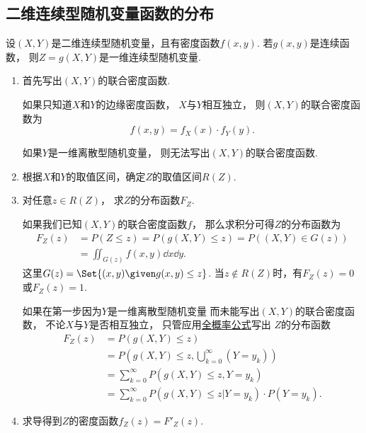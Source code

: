 \subsection{二维连续型随机变量函数的分布}
设\((X,Y)\)是二维连续型随机变量，且有密度函数\(f(x,y)\).
若\(g(x,y)\)是连续函数，
则\(Z = g(X,Y)\)是一维连续型随机变量.
\begin{enumerate}
	\item 首先写出\((X,Y)\)的联合密度函数.

	如果只知道\(X\)和\(Y\)的边缘密度函数，
	\(X\)与\(Y\)相互独立，
	则\((X,Y)\)的联合密度函数为\begin{equation*}
		f(x,y) = f_X(x) \cdot f_Y(y).
	\end{equation*}

	如果\(Y\)是一维离散型随机变量，
	则无法写出\((X,Y)\)的联合密度函数.

	\item 根据\(X\)和\(Y\)的取值区间，确定\(Z\)的取值区间\(R(Z)\).

	\item 对任意\(z \in R(Z)\)，
	求\(Z\)的分布函数\(F_Z\).

	如果我们已知\((X,Y)\)的联合密度函数\(f\)，
	那么求积分可得\(Z\)的分布函数为\begin{align*}
		F_Z(z) &= P(Z \leq z)
		= P(g(X,Y) \leq z)
		= P((X,Y) \in G(z)) \\
		&= \iint_{G(z)} f(x,y) \dd{x}\dd{y}.
	\end{align*}
	这里\(G(z) = \Set{ (x,y) \given g(x,y) \leq z }\).
	当\(z \notin R(Z)\)时，有\(F_Z(z)=0\)或\(F_Z(z)=1\).

	如果在第一步因为\(Y\)是一维离散型随机变量
	而未能写出\((X,Y)\)的联合密度函数，
	不论\(X\)与\(Y\)是否相互独立，
	只管应用\hyperref[equation:条件概率.全概率公式]{全概率公式}写出
	\(Z\)的分布函数\begin{align*}
		F_Z(z)
		&= P(g(X,Y) \leq z) \\
		&= P\left( g(X,Y) \leq z, \bigcup_{k=0}^\infty (Y = y_k) \right) \\
		&= \sum_{k=0}^\infty P\left( g(X,Y) \leq z, Y = y_k \right) \\
		&= \sum_{k=0}^\infty P(g(X,Y) \leq z \vert Y = y_k) \cdot P(Y = y_k).
	\end{align*}

	\item 求导得到\(Z\)的密度函数\(f_Z(z) = F'_Z(z)\).
\end{enumerate}

